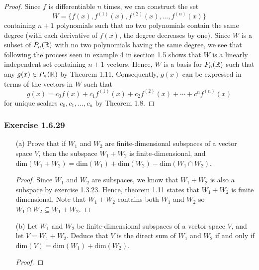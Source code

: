 \begin{proof}
    Since \( f \) is differentiable \( n  \) times, we can construct the set 
    \[  W = \{ f(x), f^{(1)}(x) , f^{(2)}(x), \dots, f^{(n)}(x) \}  \] containing \( n + 1  \) polynomials such that no two polynomials contain the same degree (with each derivative of \( f(x) \), the degree decreases by one). Since \( W  \) is a subset of \( P_{n}(\mathbb{R}) \) with no two polynomials having the same degree, we see that following the process seen in example 4 in section 1.5 shows that \( W  \) is a linearly independent set containing \( n + 1  \) vectors. Hence, \( W  \) is a basis for \( P_{n}(\mathbb{R}) \) such that any \( g(x) \in P_{n}(\mathbb{R}) \) by Theorem 1.11. Consequently, \( g(x) \) can be expressed in terms of the vectors in \( W  \) such that  
    \[  g(x) = c_{0} f(x) + c_{1} f^{(1)}(x) + c_{2} f^{(2)}(x) + \cdots + c^{n} f^{(n)}(x)  \]
    for unique scalars \( c_{0}, c_{1}, \dots, c_{n} \) by Theorem 1.8. 
\end{proof}

\subsubsection{Exercise 1.6.29} 
\begin{enumerate}
    \item[(a)] Prove that if \( W_{1}  \) and \( W_{2}  \) are finite-dimensional subspaces of a vector space \( V  \), then the subspace \( W_{1} + W_{2} \) is finite-dimensional, and \( \text{dim}(W_{1} + W_{2}) = \text{dim}(W_{1}) + \text{dim}(W_{2}) - \text{dim}(W_{1} \cap W_{2}) \).
        \begin{proof}
        Since \( W_{1} \) and \( W_{2} \) are subspaces, we know that \( W_{1} + W_{2} \) is also a subspace by exercise 1.3.23. Hence, theorem 1.11 states that \( W_{1} + W_{2} \) is finite dimensional. Note that \( W_{1} + W_{2} \) contains both \( W_{1}  \) and \( W_{2} \) so \( W_{1} \cap W_{2} \subseteq W_{1} + W_{2} \).
        \end{proof}
    \item[(b)] Let \( W_{1}  \) and \( W_{2} \) be finite-dimensional subspaces of a vector space \( V  \), and let \( V = W_{1} + W_{2} \). Deduce that \( V  \) is the direct sum of \( W_{1} \) and \( W_{2} \) if and only if \( \text{dim}(V) = \text{dim}(W_{1}) + \text{dim}(W_{2}) \).
        \begin{proof}
        
        \end{proof}
\end{enumerate}




